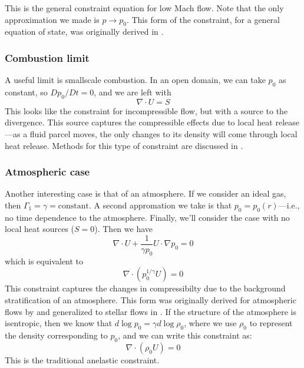 This is the general constraint equation for low Mach flow.  Note that the
only approximation we made is $p \rightarrow p_0$.  This form of the constraint,
for a general equation of state, was originally derived in \cite{ABRZ:I}.  

\subsubsection{Combustion limit}

A useful limit is smallscale combustion.  In an open domain, we can take
$p_0$ as constant, so $Dp_0/Dt = 0$, and we are left with
\begin{equation}
\nabla \cdot U = S
\end{equation}
This looks like the constraint for incompressible flow, but with a source
to the divergence.  This source captures the compressible effects due
to local heat release---as a fluid parcel moves, the only changes to
its density will come through local heat release.  Methods for this
type of constraint are discussed in \cite{pember-flame,DayBell:2000,SNpaper}.

\subsubsection{Atmospheric case}

Another interesting case is that of an atmosphere.  If we consider an
ideal gas, then $\Gamma_1 = \gamma = \mathrm{constant}$.  A second
appromation we take is that $p_0 = p_0(r)$---i.e., no time
dependence to the atmosphere.  Finally, we'll consider the case
with no local heat sources ($S = 0$).  Then we have
\begin{equation}
\nabla \cdot U + \frac{1}{\gamma p_0} U \cdot \nabla p_0 = 0
\end{equation}
which is equivalent to
\begin{equation}
\nabla \cdot \left ( p_0^{1/\gamma} U \right ) = 0
\end{equation}
This constraint captures the changes in compressibilty due to the 
background stratification of an atmosphere.  This form was originally
derived for atmospheric flows by \cite{durran:1989} and generalized to
stellar flows in \cite{ABRZ:I}.  If the structure of the
atmosphere is isentropic, then we know that $d\log p_0 = \gamma d\log \rho_0$,
where we use $\rho_0$ to represent the density corresponding to $p_0$, and
we can write this constraint as:
\begin{equation}
\nabla \cdot (\rho_0 U) = 0
\end{equation}
This is the traditional anelastic constraint.

